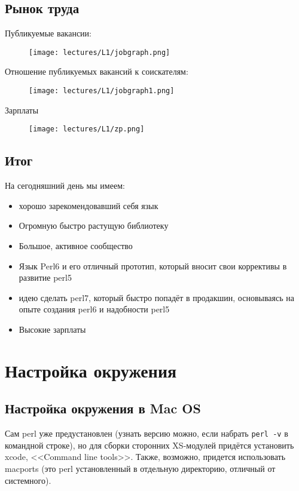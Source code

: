\subsection{Рынок труда}

Публикуемые вакансии:
\begin{figure}[H] \centering
  \texttt{[image: lectures/L1/jobgraph.png]}
\end{figure}\noindent

Отношение публикуемых вакансий к соискателям:
\begin{figure}[H] \centering
  \texttt{[image: lectures/L1/jobgraph1.png]}
\end{figure}\noindent

Зарплаты
\begin{figure}[H] \centering
  \texttt{[image: lectures/L1/zp.png]}
\end{figure}\noindent

\subsection{Итог}
На сегодняшний день мы имеем:
\begin{itemize}
 \item  хорошо зарекомендовавший себя язык
 \item Огромную быстро растущую библиотеку
 \item Большое, активное сообщество
 \item Язык Perl6 и его отличный прототип, который вносит свои коррективы в развитие perl5
 \item идею сделать perl7, который быстро попадёт в продакшин, основываясь на опыте создания perl6 и надобности perl5
 \item Высокие зарплаты
\end{itemize}


\section{Настройка окружения}
\subsection{Настройка окружения в Mac OS}
Сам perl уже предустановлен (узнать версию можно, если набрать \verb|perl -v| в командной строке), но для сборки сторонних XS-модулей придётся установить xcode, <<Command line tools>>. Также, возможно, придется использовать macports (это perl установленный в отдельную директорию, отличный от системного).

